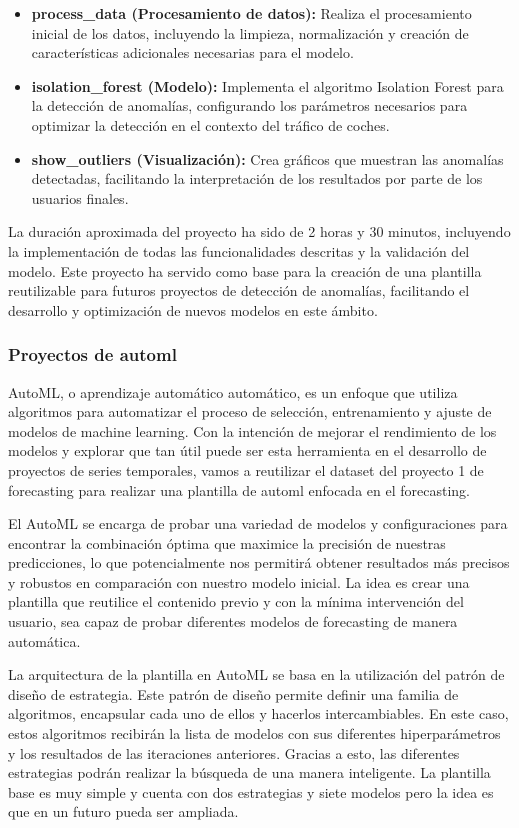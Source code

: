 \begin{itemize}
    \item \textbf{process\_data (Procesamiento de datos):} Realiza el procesamiento 
    inicial de los datos, incluyendo la limpieza, normalización y creación de 
    características adicionales necesarias para el modelo.
    \item \textbf{isolation\_forest (Modelo):} Implementa el algoritmo Isolation 
    Forest para la detección de anomalías, configurando los parámetros necesarios 
    para optimizar la detección en el contexto del tráfico de coches.
    \item \textbf{show\_outliers (Visualización):} Crea gráficos que muestran las 
    anomalías detectadas, facilitando la interpretación de los resultados por parte 
    de los usuarios finales.
\end{itemize}
    
La duración aproximada del proyecto ha sido de 2 horas y 30 minutos, incluyendo la 
implementación de todas las funcionalidades descritas y la validación del modelo. 
Este proyecto ha servido como base para la creación de una plantilla reutilizable 
para futuros proyectos de detección de anomalías, facilitando el desarrollo y 
optimización de nuevos modelos en este ámbito.

\subsubsection{Proyectos de automl}
AutoML, o aprendizaje automático automático, es un enfoque que utiliza algoritmos 
para automatizar el proceso de selección, entrenamiento y ajuste de modelos de 
machine learning. Con la intención de mejorar el rendimiento de los modelos y
explorar que tan útil puede ser esta herramienta en el desarrollo de proyectos
de series temporales, vamos a reutilizar el dataset del proyecto 1 de forecasting
para realizar una plantilla de automl enfocada en el forecasting.\medskip

El AutoML se encarga de probar una variedad de modelos y configuraciones 
para encontrar la combinación óptima que maximice la precisión de nuestras 
predicciones, lo que potencialmente nos permitirá obtener resultados más precisos 
y robustos en comparación con nuestro modelo inicial. La idea es crear una plantilla
que reutilice el contenido previo y con la mínima intervención del usuario, sea capaz
de probar diferentes modelos de forecasting de manera automática.\medskip

La arquitectura de la plantilla en AutoML se basa en la utilización del patrón
de diseño de estrategia. Este patrón de diseño permite definir una familia de algoritmos,
encapsular cada uno de ellos y hacerlos intercambiables. En este caso, estos algoritmos
recibirán la lista de modelos con sus diferentes hiperparámetros y los resultados de las
iteraciones anteriores. Gracias a esto, las diferentes estrategias podrán realizar la
búsqueda de una manera inteligente. La plantilla base es muy simple y cuenta con dos estrategias 
y siete modelos pero la idea es que en un futuro pueda ser ampliada.\medskip


